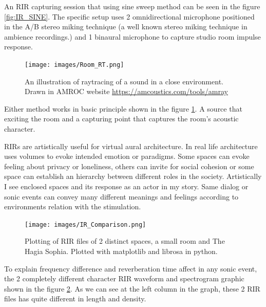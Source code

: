             An RIR capturing session that using sine sweep method can be seen in the figure \ref{fig:IR_SINE}. The specific setup uses 2 omnidirectional microphone positioned in the A/B stereo miking technique (a well known stereo miking technique in ambience recordings.)\cite{Sound_Reinforcement}\cite{Professional_Microphone_Techniques} and 1 binaural microphone to capture studio room impulse response.\par

            \begin{figure}[H]
                \centering
                \texttt{[image: images/Room\_RT.png]}
                \caption{An illustration of raytracing of a sound in a close environment. Drawn in AMROC website \url{https://amcoustics.com/tools/amray}}
                \label{fig:IR_RAYTRACE}
            \end{figure}

            Either method works in basic principle shown in the figure \ref{fig:IR_RAYTRACE}. A source that exciting the room and a capturing point that captures the room's acoustic character.\par

            RIRs are artistically useful for virtual aural architecture. In real life architecture uses volumes to evoke intended emotion or paradigms. Some spaces can evoke feeling about privacy or loneliness, others can invite for social cohesion or some space can establish an hierarchy between different roles in the society\cite{Spaces_Speak_Are_You_Listening?}. Artistically I see enclosed spaces and its response as an actor in my story. Same dialog or sonic events can convey many different meanings and feelings according to environments relation with the stimulation.\par

            \begin{figure}[H]
                \centering
                \texttt{[image: images/IR\_Comparison.png]}
                \caption{Plotting of RIR files of 2 distinct spaces, a small room and The Hagia Sophia. Plotted with matplotlib and librosa in python.}
                \label{fig:IR_COMP}
            \end{figure}

            To explain frequency difference and reverberation time affect in any sonic event, the 2 completely different character RIR waveform and spectrogram graphic shown in the figure \ref{fig:IR_COMP}. As we can see at the left column in the graph, these 2 RIR files has quite different in length and density.\par

